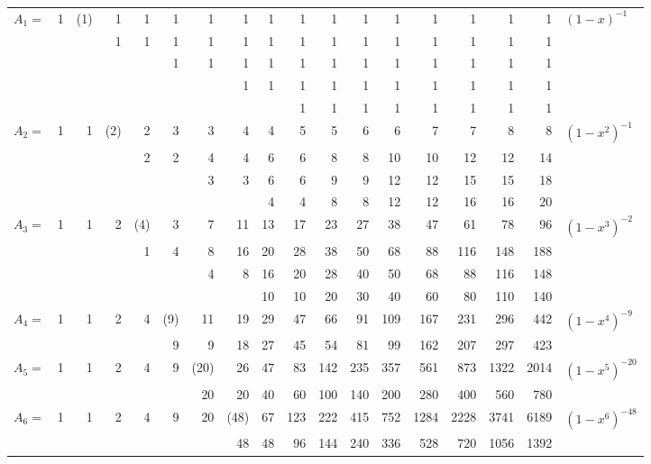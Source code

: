 \documentclass[12pt,a4paper]{article}
\theoremstyle{plain}
\begin{document}
\begin{center}
\renewcommand{\arraystretch}{1.15}
\begin{tabular}{r|rrrrrrrrrrrrrrrr|l}
$A_1=$ & 1 & (1) & 1 & 1 & 1 & 1 & 1 & 1 & 1 & 1 & 1 & 1 & 1 & 1 & 1 & 1 & $(1-x)^{-1}$\\
       &   &     & 1 & 1 & 1 & 1 & 1 & 1 & 1 & 1 & 1 & 1 & 1 & 1 & 1 & 1 & \\
       &   &     &   &   & 1 & 1 & 1 & 1 & 1 & 1 & 1 & 1 & 1 & 1 & 1 & 1 & \\
       &   &     &   &   &   &   & 1 & 1 & 1 & 1 & 1 & 1 & 1 & 1 & 1 & 1 & \\
       &   &     &   &   &   &   &   &   & 1 & 1 & 1 & 1 & 1 & 1 & 1 & 1 & \\
\hline
$A_2=$ & 1 & 1 & (2) & 2 & 3 & 3 & 4 & 4 & 5 & 5 & 6 & 6 & 7 & 7 & 8 & 8 & $(1-x^2)^{-1}$\\
       &   &   &     & 2 & 2 & 4 & 4 & 6 & 6 & 8 & 8 & 10 & 10 & 12 & 12 & 14 & \\
       &   &   &     &   &   & 3 & 3 & 6 & 6 & 9 & 9 & 12 & 12 & 15 & 15 & 18 & \\
       &   &   &     &   &   &   &   & 4 & 4 & 8 & 8 & 12 & 12 & 16 & 16 & 20 & \\
\hline
$A_3=$ & 1 & 1 & 2 & (4) & 3 & 7 & 11 & 13 & 17 & 23 & 27 & 38 & 47 & 61 & 78 & 96 & $(1-x^3)^{-2}$\\
       &   &   &   & 1 & 4 & 8 & 16 & 20 & 28 & 38 & 50 & 68 & 88 & 116 & 148 & 188 & \\
       &   &   &   &   &   & 4 & 8 & 16 & 20 & 28 & 40 & 50 & 68 & 88 & 116 & 148 & \\
       &   &   &   &   &   &   &   & 10 & 10 & 20 & 30 & 40 & 60 & 80 & 110 & 140 & \\
\hline
$A_4=$ & 1 & 1 & 2 & 4 & (9) & 11 & 19 & 29 & 47 & 66 & 91 & 109 & 167 & 231 & 296 & 442 & $(1-x^4)^{-9}$\\
       &   &   &   &   & 9 & 9 & 18 & 27 & 45 & 54 & 81 & 99 & 162 & 207 & 297 & 423 & \\
\hline
$A_5=$ & 1 & 1 & 2 & 4 & 9 & (20) & 26 & 47 & 83 & 142 & 235 & 357 & 561 & 873 & 1322 & 2014 & $(1-x^5)^{-20}$\\
       &   &   &   &   &   & 20 & 20 & 40 & 60 & 100 & 140 & 200 & 280 & 400 & 560 & 780 & \\
\hline
$A_6=$ & 1 & 1 & 2 & 4 & 9 & 20 & (48) & 67 & 123 & 222 & 415 & 752 & 1284 & 2228 & 3741 & 6189 & $(1-x^6)^{-48}$\\
       &   &   &   &   &   &   & 48 & 48 & 96 & 144 & 240 & 336 & 528 & 720 & 1056 & 1392 & \\

\end{tabular}
\end{center}
\end{document}
